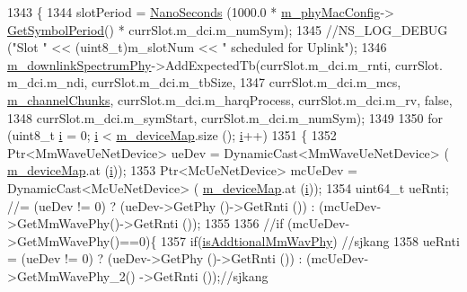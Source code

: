 \begin{DoxyCode}
1343         \{
1344                 slotPeriod = \hyperlink{group__timecivil_ga281d64bcb4dad96267d83c7688ec433f}{NanoSeconds} (1000.0 * \hyperlink{classns3_1_1MmWavePhy_a869abf36bbdbb94eed77ba6e4846f6e4}{m\_phyMacConfig}->
      \hyperlink{classns3_1_1MmWavePhyMacCommon_a1048fa4a24a72abc5d4d982efd6c21af}{GetSymbolPeriod}() * currSlot.m\_dci.m\_numSym);
1345                 \textcolor{comment}{//NS\_LOG\_DEBUG ("Slot " << (uint8\_t)m\_slotNum << " scheduled for Uplink");}
1346                 \hyperlink{classns3_1_1MmWavePhy_aa266d9d20ba903f9adf2695dd626b885}{m\_downlinkSpectrumPhy}->AddExpectedTb(currSlot.m\_dci.m\_rnti, currSlot.
      m\_dci.m\_ndi, currSlot.m\_dci.m\_tbSize,
1347                                                      currSlot.m\_dci.m\_mcs, 
      \hyperlink{classns3_1_1MmWaveEnbPhy_a0aa065c471eb33a7bf9ba6acb966b8ff}{m\_channelChunks}, currSlot.m\_dci.m\_harqProcess, currSlot.m\_dci.m\_rv, \textcolor{keyword}{false},
1348                                                      currSlot.m\_dci.m\_symStart, currSlot.m\_dci.m\_numSym);
1349 
1350                 \textcolor{keywordflow}{for} (uint8\_t \hyperlink{bernuolliDistribution_8m_a6f6ccfcf58b31cb6412107d9d5281426}{i} = 0; \hyperlink{bernuolliDistribution_8m_a6f6ccfcf58b31cb6412107d9d5281426}{i} < \hyperlink{classns3_1_1MmWaveEnbPhy_a4b6fe922f96dd05597a1fe2f9a523ce9}{m\_deviceMap}.size (); \hyperlink{bernuolliDistribution_8m_a6f6ccfcf58b31cb6412107d9d5281426}{i}++)
1351                 \{
1352                         Ptr<MmWaveUeNetDevice> ueDev = DynamicCast<MmWaveUeNetDevice> (
      \hyperlink{classns3_1_1MmWaveEnbPhy_a4b6fe922f96dd05597a1fe2f9a523ce9}{m\_deviceMap}.at (\hyperlink{bernuolliDistribution_8m_a6f6ccfcf58b31cb6412107d9d5281426}{i}));
1353                         Ptr<McUeNetDevice> mcUeDev = DynamicCast<McUeNetDevice> (
      \hyperlink{classns3_1_1MmWaveEnbPhy_a4b6fe922f96dd05597a1fe2f9a523ce9}{m\_deviceMap}.at (\hyperlink{bernuolliDistribution_8m_a6f6ccfcf58b31cb6412107d9d5281426}{i}));
1354                         uint64\_t ueRnti; \textcolor{comment}{//= (ueDev != 0) ? (ueDev->GetPhy ()->GetRnti ()) :
       (mcUeDev->GetMmWavePhy()->GetRnti ());}
1355 
1356                         \textcolor{comment}{//if (mcUeDev->GetMmWavePhy()==0)\{}
1357                                 \textcolor{keywordflow}{if}(\hyperlink{classns3_1_1MmWaveEnbPhy_a1a171ed81b1efedf963000d89f2cbd98}{isAddtionalMmWavPhy}) \textcolor{comment}{//sjkang}
1358                         ueRnti = (ueDev != 0) ? (ueDev->GetPhy ()->GetRnti ()) : (mcUeDev->GetMmWavePhy\_2()
      ->GetRnti ());\textcolor{comment}{//sjkang}

\end{DoxyCode}
